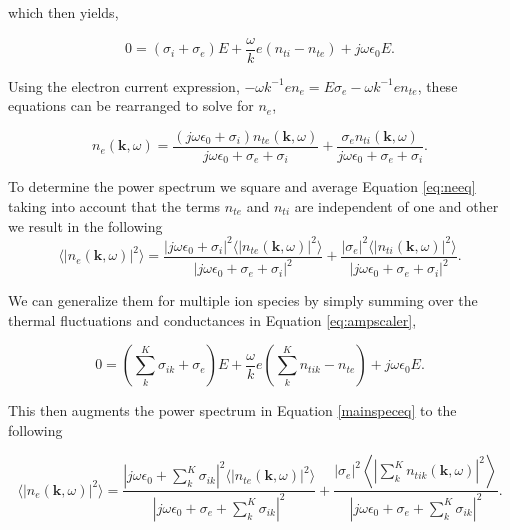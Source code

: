 \noindent which then yields,

\begin{equation} 
\label{eq:ampscaler}
0=(\sigma_i +\sigma_e)E +\frac{\omega}{k}e(n_{ti}-n_{te}) +j\omega \epsilon_0 E.
\end{equation}



\noindent Using the electron current expression, $-\omega k^{-1}en_e = E\sigma_e -\omega k^{-1}en_{te}$, these equations can be rearranged to solve for $n_e$, 

\begin{equation}
\label{eq:neeq}
n_e(\mathbf{k},\omega) =  \frac{(j\omega\epsilon_0 + \sigma_i) n_{te}(\mathbf{k},\omega)}{j\omega\epsilon_0 +\sigma_e+\sigma_i} + \frac{\sigma_en_{ti}(\mathbf{k},\omega)}{j\omega\epsilon_0 +\sigma_e+\sigma_i}.
\end{equation}

\noindent To determine the power spectrum we square and average Equation \ref{eq:neeq} taking into account that the terms $n_{te}$ and $n_{ti}$ are independent of one and other we result in the following
\begin{equation}
\label{mainspeceq}
\langle \left|n_e(\mathbf{k},\omega)\right|^2\rangle = \frac{|j\omega\epsilon_0 + \sigma_i|^2 \langle |n_{te}(\mathbf{k},\omega)|^2\rangle}{|j\omega\epsilon_0 +\sigma_e+\sigma_i|^2} + \frac{| \sigma_e|^2 \langle |n_{ti}(\mathbf{k},\omega)|^2\rangle}{|j\omega\epsilon_0 +\sigma_e+\sigma_i|^2}.
\end{equation}

We can generalize them for multiple ion species by simply summing over the thermal fluctuations and conductances in Equation \ref{eq:ampscaler},

\begin{equation} 
\label{eq:ampscalersum}
0=\left(\displaystyle \sum_k^K\sigma_{ik} +\sigma_e\right)E +\frac{\omega}{k}e\left(\sum_k^Kn_{tik}-n_{te}\right) +j\omega \epsilon_0 E.
\end{equation}

\noindent This then augments the power spectrum in Equation \ref{mainspeceq} to the following

\begin{equation}
\label{eq:sumspeceq}
\displaystyle \langle \left|n_e(\mathbf{k},\omega)\right|^2\rangle = \frac{\left|j\omega\epsilon_0 +  \sum_k^K\sigma_{ik} \right|^2 \langle |n_{te}(\mathbf{k},\omega)|^2\rangle}{\left|j\omega\epsilon_0 +\sigma_e+ \sum_k^K\sigma_{ik} \right|^2} + \frac{| \sigma_e|^2 \left \langle \left|\sum_k^Kn_{tik}(\mathbf{k},\omega)\right|^2\right\rangle}{\left|j\omega\epsilon_0 +\sigma_e+ \sum_k^K\sigma_{ik} \right|^2}.
\end{equation}

